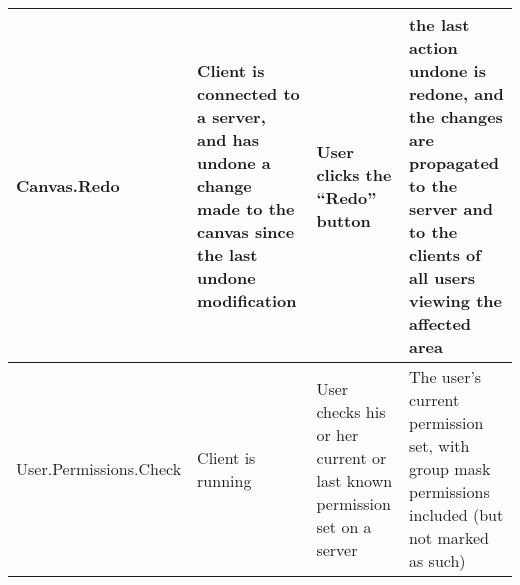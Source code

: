 \documentclass[11pt,oneside,a4paper]{article}
\begin{document}
\begin{center}
\begin{tabular}{ | p{3cm} | p{3cm} | p{3cm} | p{3cm} | }
\tiny{Canvas.Redo}				& \tiny{Client is connected to a server, and has undone a change made to the canvas since the last undone modification}	& \tiny{User clicks the ``Redo'' button}															& \tiny{the last action undone is redone, and the changes are propagated to the server and to the clients of all users viewing the affected area} \\\hline
\tiny{User.Permissions.Check}	& \tiny{Client is running}																								& \tiny{User checks his or her current or last known permission set on a server}					& \tiny{The user's current permission set, with group mask permissions included (but not marked as such)} \\\hline
\end{tabular}
\end{center}
\pagebreak
\end{document}
